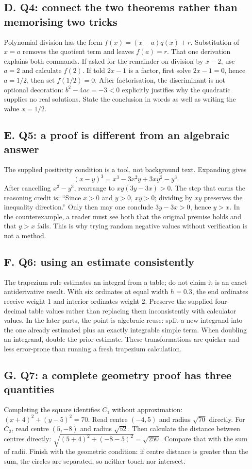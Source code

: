 \documentclass[10pt,a4paper]{article}
\begin{document}
\subsection*{D. Q4: connect the two theorems rather than memorising two tricks}
Polynomial division has the form $f(x)=(x-a)q(x)+r$. Substitution of $x=a$ removes the quotient term and leaves $f(a)=r$. That one derivation explains both commands. If asked for the remainder on division by $x-2$, use $a=2$ and calculate $f(2)$. If told $2x-1$ is a factor, first solve $2x-1=0$, hence $a=1/2$, then set $f(1/2)=0$. After factorisation, the discriminant is not optional decoration: $b^2-4ac=-3<0$ explicitly justifies why the quadratic supplies no real solutions. State the conclusion in words as well as writing the value $x=1/2$.
\newpage
\subsection*{E. Q5: a proof is different from an algebraic answer}
The supplied positivity condition is a tool, not background text. Expanding gives
\[(x-y)^3=x^3-3x^2y+3xy^2-y^3.\]
After cancelling $x^3-y^3$, rearrange to $xy(3y-3x)>0$. The step that earns the reasoning credit is: ``Since $x>0$ and $y>0$, $xy>0$; dividing by $xy$ preserves the inequality direction.'' Only then may one conclude $3y-3x>0$, hence $y>x$. In the counterexample, a reader must see both that the original premise holds and that $y>x$ fails. This is why trying random negative values without verification is not a method.
\subsection*{F. Q6: using an estimate consistently}
The trapezium rule estimates an integral from a table; do not claim it is an exact antiderivative result. With six ordinates at equal width $h=0.3$, the end ordinates receive weight 1 and interior ordinates weight 2. Preserve the supplied four-decimal table values rather than replacing them inconsistently with calculator values. In the later parts, the point is algebraic reuse: split a new integrand into the one already estimated plus an exactly integrable simple term. When doubling an integrand, double the prior estimate. These transformations are quicker and less error-prone than running a fresh trapezium calculation.
\subsection*{G. Q7: a complete geometry proof has three quantities}
Completing the square identifies $C_1$ without approximation: $(x+4)^2+(y-5)^2=70$. Read centre $(-4,5)$ and radius $\sqrt{70}$ directly. For $C_2$, read centre $(5,-8)$ and radius $\sqrt{52}$. Then calculate the distance between centres directly: $\sqrt{(5+4)^2+(-8-5)^2}=\sqrt{250}$. Compare that with the sum of radii. Finish with the geometric condition: if centre distance is greater than the sum, the circles are separated, so neither touch nor intersect.
\end{document}
